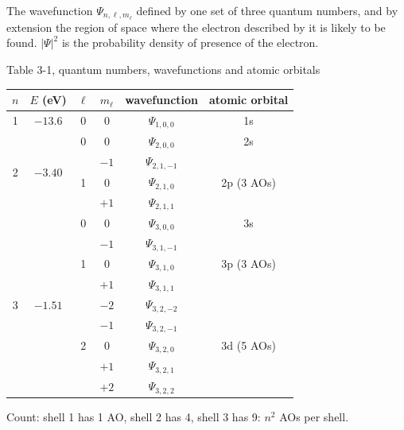 \begin{concept}
The wavefunction $\Psi_{n,\ell,m_\ell}$ defined by one set of three quantum numbers, and by extension the
region of space where the electron described by it is likely to be found. $|\Psi|^2$ is the
probability density of presence of the electron.
\end{concept}
\begin{handout}{Table 3-1, quantum numbers, wavefunctions and atomic orbitals}
\begin{center}\small
\renewcommand{\arraystretch}{1.15}
\begin{tabular}{|c|c|c|c|c|c|}
\hline
$n$ & $E$ (eV) & $\ell$ & $m_\ell$ & wavefunction & atomic orbital\\ \hline
1 & $-13.6$ & 0 & 0 & $\Psi_{1,0,0}$ & 1s\\ \hline
\multirow{4}{*}{2} & \multirow{4}{*}{$-3.40$} & 0 & 0 & $\Psi_{2,0,0}$ & 2s\\ \cline{3-6}
 & & \multirow{3}{*}{1} & $-1$ & $\Psi_{2,1,-1}$ & \multirow{3}{*}{2p (3 AOs)}\\ \cline{4-5}
 & & & 0 & $\Psi_{2,1,0}$ & \\ \cline{4-5}
 & & & $+1$ & $\Psi_{2,1,1}$ & \\ \hline
\multirow{9}{*}{3} & \multirow{9}{*}{$-1.51$} & 0 & 0 & $\Psi_{3,0,0}$ & 3s\\ \cline{3-6}
 & & \multirow{3}{*}{1} & $-1$ & $\Psi_{3,1,-1}$ & \multirow{3}{*}{3p (3 AOs)}\\ \cline{4-5}
 & & & 0 & $\Psi_{3,1,0}$ & \\ \cline{4-5}
 & & & $+1$ & $\Psi_{3,1,1}$ & \\ \cline{3-6}
 & & \multirow{5}{*}{2} & $-2$ & $\Psi_{3,2,-2}$ & \multirow{5}{*}{3d (5 AOs)}\\ \cline{4-5}
 & & & $-1$ & $\Psi_{3,2,-1}$ & \\ \cline{4-5}
 & & & 0 & $\Psi_{3,2,0}$ & \\ \cline{4-5}
 & & & $+1$ & $\Psi_{3,2,1}$ & \\ \cline{4-5}
 & & & $+2$ & $\Psi_{3,2,2}$ & \\ \hline
\end{tabular}
\end{center}
Count: shell 1 has 1 AO, shell 2 has 4, shell 3 has 9: $n^2$ AOs per shell.
\end{handout}

